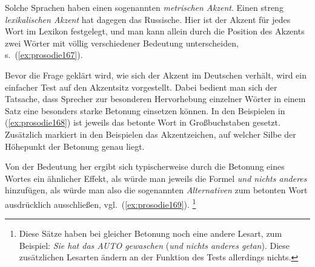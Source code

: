 \begin{exe}
\end{exe}

Solche Sprachen haben einen sogenannten \textit{metrischen Akzent}.
Einen streng \textit{lexikalischen Akzent} hat dagegen das Russische.
Hier ist der Akzent für jedes Wort im Lexikon festgelegt, und man kann allein durch die Position des Akzents zwei Wörter mit völlig verschiedener Bedeutung unterscheiden, s.\ (\ref{ex:prosodie167}).

\begin{exe}
\end{exe}

Bevor die Frage geklärt wird, wie sich der Akzent im Deutschen verhält, wird ein einfacher Test auf den Akzentsitz vorgestellt.
Dabei bedient man sich der Tatsache, dass Sprecher zur besonderen Hervorhebung einzelner Wörter in einem Satz eine besonders starke Betonung einsetzen können.
In den Beispielen in (\ref{ex:prosodie168}) ist jeweils das betonte Wort in Großbuchstaben gesetzt.
Zusätzlich markiert in den Beispielen das Akzentzeichen, auf welcher Silbe der Höhepunkt der Betonung genau liegt.

\begin{exe}
  \ex\label{ex:prosodie168}
  \begin{xlist}
  \end{xlist}
\end{exe}

Von der Bedeutung her ergibt sich typischerweise durch die Betonung eines Wortes ein ähnlicher Effekt, als würde man jeweils die Formel \textit{und nichts anderes} hinzufügen, als würde man also die sogenannten \textit{Alternativen} zum betonten Wort ausdrücklich ausschließen, vgl.\ (\ref{ex:prosodie169}).%
\footnote{Diese Sätze haben bei gleicher Betonung noch eine andere Lesart, zum Beispiel:
\textit{Sie hat das AUTO gewaschen }(\textit{und nichts anderes getan}).
Diese zusätzlichen Lesarten ändern an der Funktion des Tests allerdings nichts.}

\begin{exe}
  \ex\label{ex:prosodie169}
  \begin{xlist}
  \end{xlist}
\end{exe}

